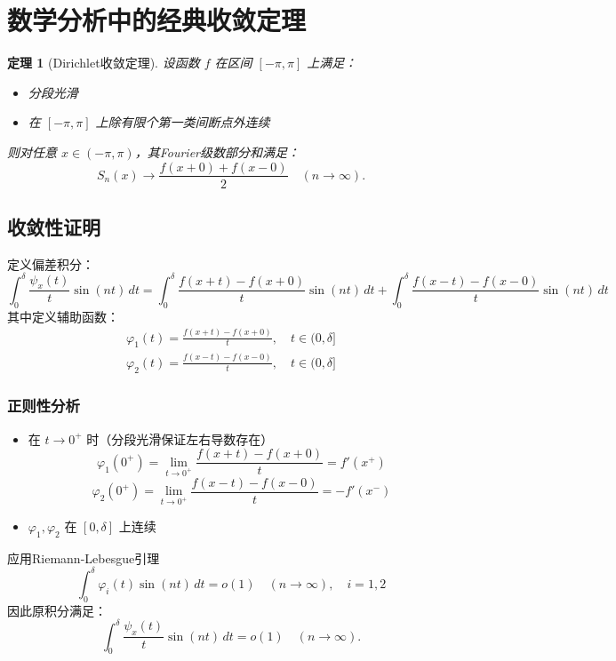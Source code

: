 \documentclass[12pt]{article}
\newtheorem{theorem}{定理}  %
\begin{document}
\section{数学分析中的经典收敛定理}

\begin{theorem}[Dirichlet收敛定理]
	设函数 $f$ 在区间 $[-\pi, \pi]$ 上满足：
	\begin{itemize}
		\item 分段光滑
		\item 在 $[-\pi, \pi]$ 上除有限个第一类间断点外连续
	\end{itemize}
	则对任意 $x \in (-\pi, \pi)$，其Fourier级数部分和满足：
	\[
	S_n(x) \to \frac{f(x+0) + f(x-0)}{2} \quad (n \to \infty).
	\]
\end{theorem}

\subsection{收敛性证明}
定义偏差积分：
\[
\int_0^\delta \frac{\psi_x(t)}{t} \sin(nt) \, dt = \int_0^\delta \frac{f(x+t)-f(x+0)}{t} \sin(nt) \, dt + \int_0^\delta \frac{f(x-t)-f(x-0)}{t} \sin(nt) \, dt
\]
其中定义辅助函数：
\[
\begin{aligned}
	\varphi_1(t) = \frac{f(x+t)-f(x+0)}{t}, \quad t \in (0, \delta] \\
	\varphi_2(t) = \frac{f(x-t)-f(x-0)}{t}, \quad t \in (0, \delta]
\end{aligned}
\]

\subsubsection{正则性分析}
\begin{itemize}
	\item 在 $t \to 0^+$ 时（分段光滑保证左右导数存在）
	\[
	\varphi_1(0^+) = \lim_{t \to 0^+} \frac{f(x+t)-f(x+0)}{t} = f'(x^+)
	\]
	\[
	\varphi_2(0^+) = \lim_{t \to 0^+} \frac{f(x-t)-f(x-0)}{t} = -f'(x^-)
	\]
	\item $\varphi_1, \varphi_2$ 在 $[0, \delta]$ 上连续
\end{itemize}

应用Riemann-Lebesgue引理
\[
\int_0^\delta \varphi_i(t) \sin(nt) \, dt = o(1) \quad (n \to \infty),\quad i=1,2
\]
因此原积分满足：
\[
\int_0^\delta \frac{\psi_x(t)}{t} \sin(nt) \, dt = o(1) \quad (n \to \infty).
\]


	
\end{document}
